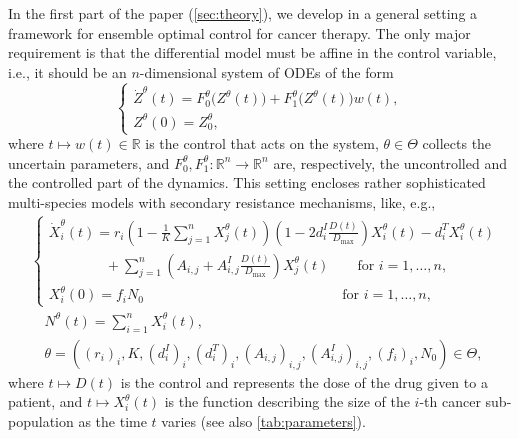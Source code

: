 \documentclass[a4paper,12pt, reqno]{amsart}
\theoremstyle{plain}
\theoremstyle{definition}
\theoremstyle{remark}
\numberwithin{equation}{section}
\newcommand{\R}{\mathbb{R}}
\begin{document}
{In the first part of the paper (\cref{sec:theory}), we develop in a general setting a framework for ensemble optimal control for cancer therapy.
The only major requirement is that the differential model must be affine in the control variable, i.e., it should be an $n$-dimensional system of ODEs of the form
\begin{equation} \label{eq:intro_affine_syst}
    \begin{cases}
        \dot Z^\theta(t) = F_0^\theta\big(Z^\theta(t)\big) + F_1^\theta\big(Z^\theta(t)\big)w(t), \\
        Z^\theta(0) = Z_0^\theta,
    \end{cases}
\end{equation}
where $t\mapsto w(t) \in \mathbb R$ is the control that acts on the system, $\theta\in\Theta$ collects the uncertain parameters, and $F_0^\theta, F_1 ^\theta \colon \R^n\to \R^n$ are, respectively, the uncontrolled and the controlled part of the dynamics. 
This setting encloses rather sophisticated multi-species models with secondary resistance mechanisms, like, e.g., 
\begin{equation} \label{eq:intro_soph_model}
\begin{split}
    &\begin{cases}
        \dot X_i^\theta(t) = r_i \left( 1- \frac1K \sum_{j=1}^n X_j^\theta(t) \right)  \left(  1-2d_i^I \frac{D(t)}{D_{\max}}\right) X_i^\theta(t) - d_i^T X_i^\theta(t) \\
        \qquad \qquad + \sum_{j=1}^n\left( A_{i,j} + A^I_{i,j}\frac{D(t)}{D_{\max}} \right) X_j^\theta(t) \qquad \mbox{for }i=1,\ldots,n, \\
        X^\theta_i(0) = f_i N_0 \qquad\qquad\qquad\qquad\qquad\qquad\quad \quad \, \mbox{for }i=1,\ldots,n,
    \end{cases}\\
& \quad N^\theta(t) = \sum_{i=1}^n X_i^\theta(t),\\
& \quad \theta = \left( (r_i)_{i}, K, (d^I_i)_{i}, (d^T_i)_{i},  (A_{i,j})_{i,j} , (A_{i,j}^I)_{i,j}, (f_i)_i, N_0 \right) \in \Theta,
    \end{split}
\end{equation}
where $t\mapsto D(t)$ is the control and represents the dose of the drug given to a patient, and $t\mapsto X_i^\theta(t)$ is the function describing the size of the $i$-th cancer sub-population as the time $t$ varies (see also \cref{tab:parameters}).
\begin{table}[b]
\centering
\begin{tabular}{lll}

\end{tabular}
\end{table}}
\end{document}
